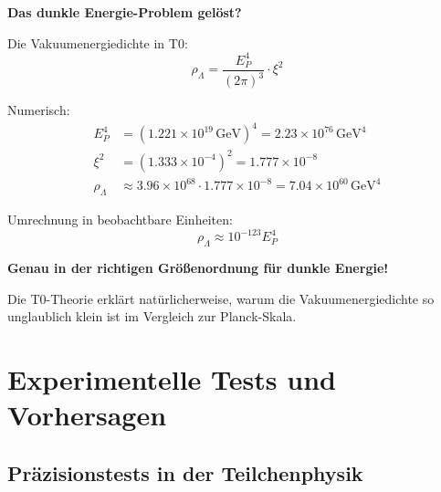 \documentclass[12pt,a4paper]{article}
\newcommand{\xipar}{\xi}
\begin{document}
	\begin{erkenntnis}
		\textbf{Das dunkle Energie-Problem gelöst?}
		
		Die Vakuumenergiedichte in T0:
		\begin{equation}
			\rho_{\Lambda} = \frac{E_P^4}{(2\pi)^3} \cdot \xipar^2
		\end{equation}
		
		Numerisch:
		\begin{align}
			E_P^4 &= (1.221 \times 10^{19}\, \text{GeV})^4 = 2.23 \times 10^{76}\, \text{GeV}^4 \\
			\xipar^2 &= (1.333 \times 10^{-4})^2 = 1.777 \times 10^{-8} \\
			\rho_{\Lambda} &\approx 3.96 \times 10^{68} \cdot 1.777 \times 10^{-8} = 7.04 \times 10^{60}\, \text{GeV}^4
		\end{align}
		
		Umrechnung in beobachtbare Einheiten:
		\begin{equation}
			\rho_{\Lambda} \approx 10^{-123} E_P^4
		\end{equation}
		
		\textbf{Genau in der richtigen Größenordnung für dunkle Energie!}
		
		Die T0-Theorie erklärt natürlicherweise, warum die Vakuumenergiedichte so unglaublich klein ist im Vergleich zur Planck-Skala.
	\end{erkenntnis}
	
	\section{Experimentelle Tests und Vorhersagen}
	
	\subsection{Präzisionstests in der Teilchenphysik}
	
\end{document}
